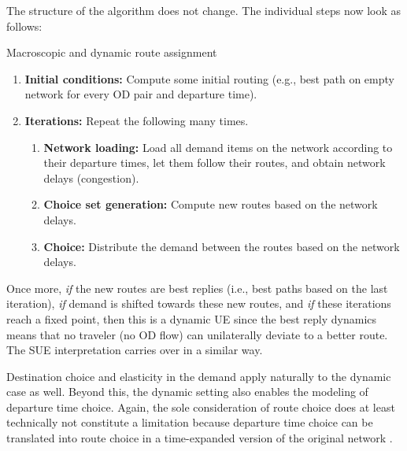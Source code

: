 The structure of the algorithm does not change. The individual steps now look as follows:
\begin{algorithm}[H]
\label{dynamic-macro-routes}

\caption{Macroscopic and dynamic route assignment}

\begin{enumerate}

\item \textbf{Initial conditions:} Compute some initial routing (e.g., best path on empty network
  for every OD pair and departure time).

\item \textbf{Iterations:} Repeat the following many times.

\begin{enumerate}

\item \textbf{Network loading:} Load all demand items on the network
  according to their departure times, let them follow their
  routes, and obtain network delays (congestion).

\item \textbf{Choice set generation:} Compute new routes based on the
  network delays.

\item \textbf{Choice:} Distribute the demand between the routes based
  on the network delays.

\end{enumerate} %

\end{enumerate}

\end{algorithm}

Once more, \emph{if} the new routes are best replies (i.e., best paths
based on the last iteration), \emph{if} demand is shifted towards
these new routes, and \emph{if} these iterations reach a fixed point,
then this is a dynamic UE since the best reply dynamics means that no
traveler (no OD flow) can unilaterally deviate to a better route.  The
SUE interpretation carries over in a similar way.

Destination choice and elasticity in the demand apply naturally to the dynamic case as well. Beyond this, the dynamic setting also enables the modeling of departure time choice. Again, the sole consideration of route choice does at least technically not constitute a limitation because departure time choice can be translated into route choice in a time-expanded version of the original network \citep{vanderzijpp-2001}.

